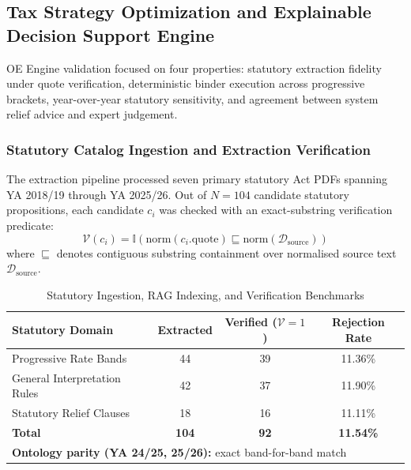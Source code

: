 \documentclass[conference]{IEEEtran}
\begin{document}
\subsection{Tax Strategy Optimization and Explainable Decision Support Engine}
OE Engine validation focused on four properties: statutory extraction fidelity under quote verification, deterministic binder execution across progressive brackets, year-over-year statutory sensitivity, and agreement between system relief advice and expert judgement.

\subsubsection{Statutory Catalog Ingestion and Extraction Verification}
The extraction pipeline processed seven primary statutory Act PDFs spanning YA 2018/19 through YA 2025/26. Out of $N=104$ candidate statutory propositions, each candidate $c_i$ was checked with an exact-substring verification predicate:
\begin{equation}
\mathcal{V}(c_i) = \mathbb{I}\left( \text{norm}(c_i.\text{quote}) \sqsubseteq \text{norm}(\mathcal{D}_{\text{source}}) \right)
\end{equation}
where $\sqsubseteq$ denotes contiguous substring containment over normalised source text $\mathcal{D}_{\text{source}}$.

\begin{table}[htbp]
\caption{Statutory Ingestion, RAG Indexing, and Verification Benchmarks}
\begin{center}
\renewcommand{\arraystretch}{1.2}
\setlength{\tabcolsep}{3.5pt}
\begin{tabularx}{\columnwidth}{|X|c|c|c|}
\hline
\textbf{Statutory Domain} & \textbf{Extracted} & \textbf{Verified ($\mathcal{V}=1$)} & \textbf{Rejection Rate} \\
\hline
Progressive Rate Bands & 44 & 39 & 11.36\% \\
General Interpretation Rules & 42 & 37 & 11.90\% \\
Statutory Relief Clauses & 18 & 16 & 11.11\% \\
\hline
\textbf{Total} & \textbf{104} & \textbf{92} & \textbf{11.54\%} \\
\hline
\multicolumn{4}{|l|}{\textbf{Ontology parity (YA 24/25, 25/26):} exact band-for-band match} \\
\hline
\end{tabularx}
\label{tab:catalog_extraction}
\end{center}
\end{table}
\end{document}
